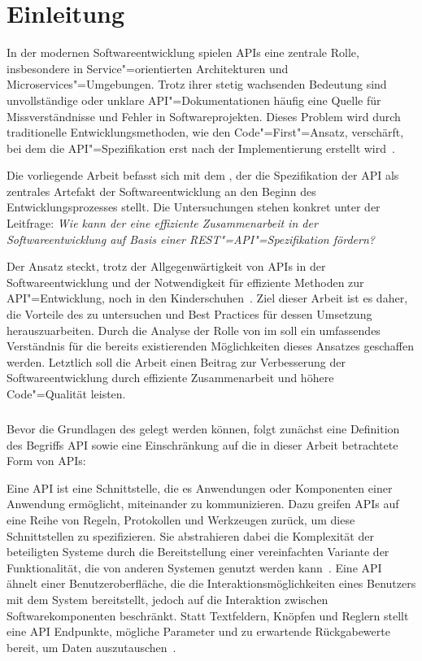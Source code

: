 \chapter{Einleitung}
\label{ch:introduction}
In der modernen Softwareentwicklung spielen \acp{API} eine zentrale Rolle, insbesondere in Service"=orientierten Architekturen und Microservices"=Umgebungen.
Trotz ihrer stetig wachsenden Bedeutung sind unvollständige oder unklare \ac{API}"=Dokumentationen häufig eine Quelle für Missverständnisse und Fehler in Softwareprojekten.
Dieses Problem wird durch traditionelle Entwicklungsmethoden, wie den Code"=First"=Ansatz, verschärft, bei dem die \ac{API}"=Spezifikation erst nach der Implementierung erstellt wird~\cite[73]{bea22}.

Die vorliegende Arbeit befasst sich mit dem \AFA, der die Spezifikation der \ac{API} als zentrales Artefakt der Softwareentwicklung an den Beginn des Entwicklungsprozesses stellt.
Die Untersuchungen stehen konkret unter der Leitfrage: \emph{Wie kann der \AFA eine effiziente Zusammenarbeit in der Softwareentwicklung auf Basis einer \acs{REST}"=\acs{API}"=Spezifikation fördern?}

Der Ansatz steckt, trotz der Allgegenwärtigkeit von \acp{API} in der Softwareentwicklung und der Notwendigkeit für effiziente Methoden zur \ac{API}"=Entwicklung, noch in den Kinderschuhen~\cite[78]{bea22}.
Ziel dieser Arbeit ist es daher, die Vorteile des \AFAes zu untersuchen und Best Practices für dessen Umsetzung herauszuarbeiten.
Durch die Analyse der Rolle von \OA im \AFA soll ein umfassendes Verständnis für die bereits existierenden Möglichkeiten dieses Ansatzes geschaffen werden.
Letztlich soll die Arbeit einen Beitrag zur Verbesserung der Softwareentwicklung durch effiziente Zusammenarbeit und höhere Code"=Qualität leisten.

\paragraph{}
Bevor die Grundlagen des \AFAes gelegt werden können, folgt zunächst eine Definition des Begriffs \acf{API} sowie eine Einschränkung auf die in dieser Arbeit betrachtete Form von \acp{API}:

Eine \ac{API} ist eine Schnittstelle, die es Anwendungen oder Komponenten einer Anwendung ermöglicht, miteinander zu kommunizieren.
Dazu greifen \acp{API} auf eine Reihe von Regeln, Protokollen und Werkzeugen zurück, um diese Schnittstellen zu spezifizieren.
Sie abstrahieren dabei die Komplexität der beteiligten Systeme durch die Bereitstellung einer vereinfachten Variante der Funktionalität, die von anderen Systemen genutzt werden kann~\cite[1]{kul23}.
Eine \ac{API} ähnelt einer Benutzeroberfläche, die die Interaktionsmöglichkeiten eines Benutzers mit dem System bereitstellt, jedoch auf die Interaktion zwischen Softwarekomponenten beschränkt.
Statt Textfeldern, Knöpfen und Reglern stellt eine \ac{API} Endpunkte, mögliche Parameter und zu erwartende Rückgabewerte bereit, um Daten auszutauschen~\cites[351]{de23}{ope23a}.


